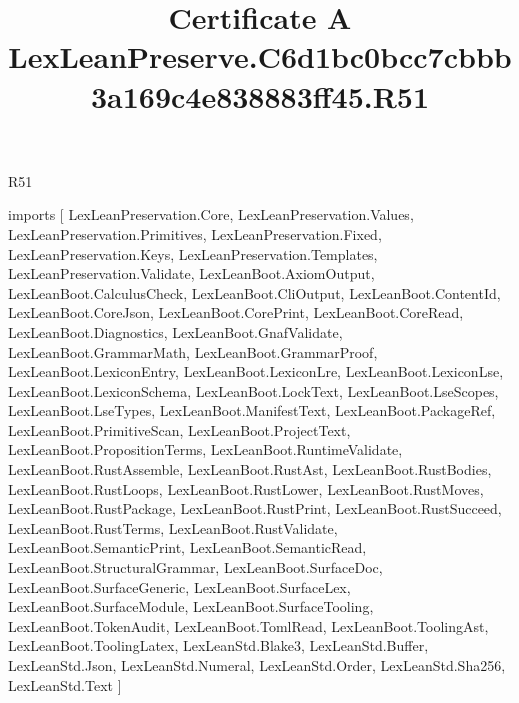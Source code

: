 \begin{lexlean}{R51}
\title{Certificate A LexLeanPreserve.C6d1bc0bcc7cbbb3a169c4e838883ff45.R51}
\begin{coremodule}
imports [
  LexLeanPreservation.Core,
  LexLeanPreservation.Values,
  LexLeanPreservation.Primitives,
  LexLeanPreservation.Fixed,
  LexLeanPreservation.Keys,
  LexLeanPreservation.Templates,
  LexLeanPreservation.Validate,
  LexLeanBoot.AxiomOutput,
  LexLeanBoot.CalculusCheck,
  LexLeanBoot.CliOutput,
  LexLeanBoot.ContentId,
  LexLeanBoot.CoreJson,
  LexLeanBoot.CorePrint,
  LexLeanBoot.CoreRead,
  LexLeanBoot.Diagnostics,
  LexLeanBoot.GnafValidate,
  LexLeanBoot.GrammarMath,
  LexLeanBoot.GrammarProof,
  LexLeanBoot.LexiconEntry,
  LexLeanBoot.LexiconLre,
  LexLeanBoot.LexiconLse,
  LexLeanBoot.LexiconSchema,
  LexLeanBoot.LockText,
  LexLeanBoot.LseScopes,
  LexLeanBoot.LseTypes,
  LexLeanBoot.ManifestText,
  LexLeanBoot.PackageRef,
  LexLeanBoot.PrimitiveScan,
  LexLeanBoot.ProjectText,
  LexLeanBoot.PropositionTerms,
  LexLeanBoot.RuntimeValidate,
  LexLeanBoot.RustAssemble,
  LexLeanBoot.RustAst,
  LexLeanBoot.RustBodies,
  LexLeanBoot.RustLoops,
  LexLeanBoot.RustLower,
  LexLeanBoot.RustMoves,
  LexLeanBoot.RustPackage,
  LexLeanBoot.RustPrint,
  LexLeanBoot.RustSucceed,
  LexLeanBoot.RustTerms,
  LexLeanBoot.RustValidate,
  LexLeanBoot.SemanticPrint,
  LexLeanBoot.SemanticRead,
  LexLeanBoot.StructuralGrammar,
  LexLeanBoot.SurfaceDoc,
  LexLeanBoot.SurfaceGeneric,
  LexLeanBoot.SurfaceLex,
  LexLeanBoot.SurfaceModule,
  LexLeanBoot.SurfaceTooling,
  LexLeanBoot.TokenAudit,
  LexLeanBoot.TomlRead,
  LexLeanBoot.ToolingAst,
  LexLeanBoot.ToolingLatex,
  LexLeanStd.Blake3,
  LexLeanStd.Buffer,
  LexLeanStd.Json,
  LexLeanStd.Numeral,
  LexLeanStd.Order,
  LexLeanStd.Sha256,
  LexLeanStd.Text
]


\end{coremodule}
\end{lexlean}
